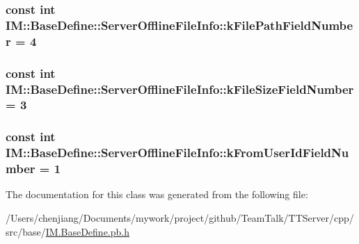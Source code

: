 \subsubsection[{k\+File\+Path\+Field\+Number}]{\setlength{\rightskip}{0pt plus 5cm}const int I\+M\+::\+Base\+Define\+::\+Server\+Offline\+File\+Info\+::k\+File\+Path\+Field\+Number = 4\hspace{0.3cm}{\ttfamily [static]}}\label{class_i_m_1_1_base_define_1_1_server_offline_file_info_ad233a24ba0def4b357d55d11d1f10006}
\hypertarget{class_i_m_1_1_base_define_1_1_server_offline_file_info_a72d8acfefb16277fc600033b7f1b71ee}{}
\subsubsection[{k\+File\+Size\+Field\+Number}]{\setlength{\rightskip}{0pt plus 5cm}const int I\+M\+::\+Base\+Define\+::\+Server\+Offline\+File\+Info\+::k\+File\+Size\+Field\+Number = 3\hspace{0.3cm}{\ttfamily [static]}}\label{class_i_m_1_1_base_define_1_1_server_offline_file_info_a72d8acfefb16277fc600033b7f1b71ee}
\hypertarget{class_i_m_1_1_base_define_1_1_server_offline_file_info_ac5c6331098e027f030f73cab0c4e329f}{}
\subsubsection[{k\+From\+User\+Id\+Field\+Number}]{\setlength{\rightskip}{0pt plus 5cm}const int I\+M\+::\+Base\+Define\+::\+Server\+Offline\+File\+Info\+::k\+From\+User\+Id\+Field\+Number = 1\hspace{0.3cm}{\ttfamily [static]}}\label{class_i_m_1_1_base_define_1_1_server_offline_file_info_ac5c6331098e027f030f73cab0c4e329f}


The documentation for this class was generated from the following file\+:\begin{DoxyCompactItemize}
\item 
/\+Users/chenjiang/\+Documents/mywork/project/github/\+Team\+Talk/\+T\+T\+Server/cpp/src/base/\hyperlink{_i_m_8_base_define_8pb_8h}{I\+M.\+Base\+Define.\+pb.\+h}\end{DoxyCompactItemize}
